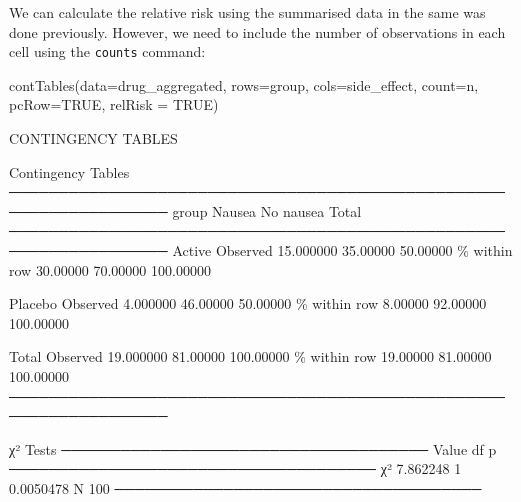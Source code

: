 \documentclass[
  a4paper,
]{memoir}
\newenvironment{Shaded}{\begin{snugshade}}{\end{snugshade}}
\newcommand{\AttributeTok}[1]{\textcolor[rgb]{0.00,0.00,0.00}{#1}}
\newcommand{\ConstantTok}[1]{\textcolor[rgb]{0.00,0.00,0.00}{#1}}
\newcommand{\DecValTok}[1]{\textcolor[rgb]{0.00,0.00,0.00}{#1}}
\newcommand{\FloatTok}[1]{\textcolor[rgb]{0.00,0.00,0.00}{#1}}
\newcommand{\FunctionTok}[1]{\textcolor[rgb]{0.00,0.00,0.00}{#1}}
\newcommand{\NormalTok}[1]{\textcolor[rgb]{0.00,0.00,0.00}{#1}}
\begin{document}
We can calculate the relative risk using the summarised data in the same
was done previously. However, we need to include the number of
observations in each cell using the \texttt{counts} command:

\begin{Shaded}
\begin{Highlighting}[]
\FunctionTok{contTables}\NormalTok{(}\AttributeTok{data=}\NormalTok{drug\_aggregated,}
           \AttributeTok{rows=}\NormalTok{group, }\AttributeTok{cols=}\NormalTok{side\_effect, }\AttributeTok{count=}\NormalTok{n,}
           \AttributeTok{pcRow=}\ConstantTok{TRUE}\NormalTok{, }\AttributeTok{relRisk =} \ConstantTok{TRUE}\NormalTok{)}
\end{Highlighting}
\end{Shaded}

\begin{Shaded}
\begin{Highlighting}[]
\NormalTok{CONTINGENCY TABLES}

\NormalTok{ Contingency Tables                                                 }
\NormalTok{ ────────────────────────────────────────────────────────────────── }
\NormalTok{   group                      Nausea       No nausea    Total       }
\NormalTok{ ────────────────────────────────────────────────────────────────── }
\NormalTok{   Active     Observed        }\FloatTok{15.000000}     \FloatTok{35.00000}     \FloatTok{50.00000}   
\NormalTok{              \% within row     }\FloatTok{30.00000}     \FloatTok{70.00000}    \FloatTok{100.00000}   
                                                                    
\NormalTok{   Placebo    Observed         }\FloatTok{4.000000}     \FloatTok{46.00000}     \FloatTok{50.00000}   
\NormalTok{              \% within row      }\FloatTok{8.00000}     \FloatTok{92.00000}    \FloatTok{100.00000}   
                                                                    
\NormalTok{   Total      Observed        }\FloatTok{19.000000}     \FloatTok{81.00000}    \FloatTok{100.00000}   
\NormalTok{              \% within row     }\FloatTok{19.00000}     \FloatTok{81.00000}    \FloatTok{100.00000}   
\NormalTok{ ────────────────────────────────────────────────────────────────── }


\NormalTok{ χ² Tests                              }
\NormalTok{ ───────────────────────────────────── }
\NormalTok{         Value       df    p           }
\NormalTok{ ───────────────────────────────────── }
\NormalTok{   χ²    }\FloatTok{7.862248}     \DecValTok{1}    \FloatTok{0.0050478}   
\NormalTok{   N          }\DecValTok{100}                      
\NormalTok{ ───────────────────────────────────── }



\end{Highlighting}
\end{Shaded}
\end{document}
